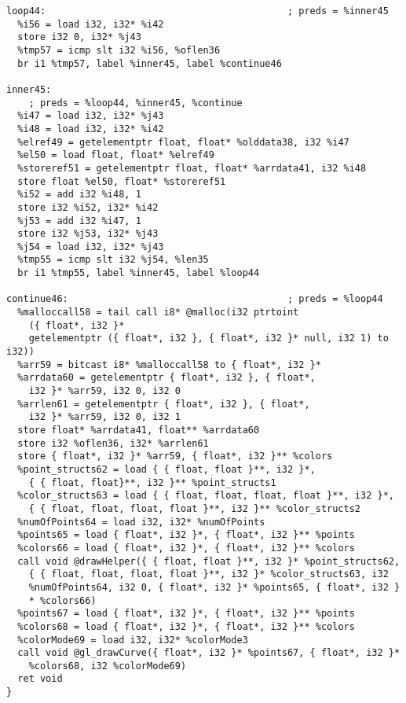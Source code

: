 \documentclass[main.tex]{subfiles}
\begin{document}
{\begin{lstlisting}
loop44:                                           ; preds = %inner45
  %i56 = load i32, i32* %i42
  store i32 0, i32* %j43
  %tmp57 = icmp slt i32 %i56, %oflen36
  br i1 %tmp57, label %inner45, label %continue46

inner45:                                          
    ; preds = %loop44, %inner45, %continue
  %i47 = load i32, i32* %j43
  %i48 = load i32, i32* %i42
  %elref49 = getelementptr float, float* %olddata38, i32 %i47
  %el50 = load float, float* %elref49
  %storeref51 = getelementptr float, float* %arrdata41, i32 %i48
  store float %el50, float* %storeref51
  %i52 = add i32 %i48, 1
  store i32 %i52, i32* %i42
  %j53 = add i32 %i47, 1
  store i32 %j53, i32* %j43
  %j54 = load i32, i32* %j43
  %tmp55 = icmp slt i32 %j54, %len35
  br i1 %tmp55, label %inner45, label %loop44

continue46:                                       ; preds = %loop44
  %malloccall58 = tail call i8* @malloc(i32 ptrtoint
    ({ float*, i32 }*
    getelementptr ({ float*, i32 }, { float*, i32 }* null, i32 1) to i32))
  %arr59 = bitcast i8* %malloccall58 to { float*, i32 }*
  %arrdata60 = getelementptr { float*, i32 }, { float*,
    i32 }* %arr59, i32 0, i32 0
  %arrlen61 = getelementptr { float*, i32 }, { float*,
    i32 }* %arr59, i32 0, i32 1
  store float* %arrdata41, float** %arrdata60
  store i32 %oflen36, i32* %arrlen61
  store { float*, i32 }* %arr59, { float*, i32 }** %colors
  %point_structs62 = load { { float, float }**, i32 }*,
    { { float, float}**, i32 }** %point_structs1
  %color_structs63 = load { { float, float, float, float }**, i32 }*, 
    { { float, float, float, float }**, i32 }** %color_structs2
  %numOfPoints64 = load i32, i32* %numOfPoints
  %points65 = load { float*, i32 }*, { float*, i32 }** %points
  %colors66 = load { float*, i32 }*, { float*, i32 }** %colors
  call void @drawHelper({ { float, float }**, i32 }* %point_structs62, 
    { { float, float, float, float }**, i32 }* %color_structs63, i32 
    %numOfPoints64, i32 0, { float*, i32 }* %points65, { float*, i32 }
    * %colors66)
  %points67 = load { float*, i32 }*, { float*, i32 }** %points
  %colors68 = load { float*, i32 }*, { float*, i32 }** %colors
  %colorMode69 = load i32, i32* %colorMode3
  call void @gl_drawCurve({ float*, i32 }* %points67, { float*, i32 }*
    %colors68, i32 %colorMode69)
  ret void
}


\end{lstlisting}}
\end{document}
